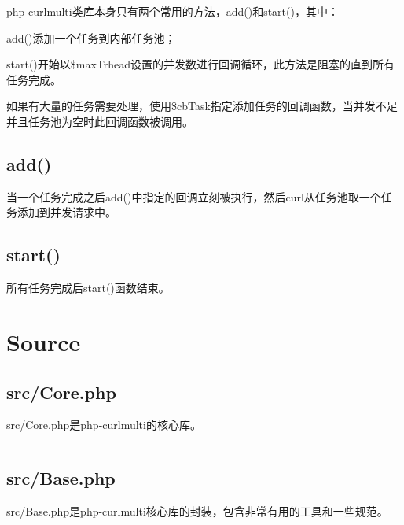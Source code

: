 php-curlmulti类库本身只有两个常用的方法，add()和start()，其中：

\begin{compactitem}
\item add()添加一个任务到内部任务池；
\item start()开始以\$maxTrhead设置的并发数进行回调循环，此方法是阻塞的直到所有任务完成。
\end{compactitem}





如果有大量的任务需要处理，使用\$cbTask指定添加任务的回调函数，当并发不足并且任务池为空时此回调函数被调用。

\subsection{add()}


当一个任务完成之后add()中指定的回调立刻被执行，然后curl从任务池取一个任务添加到并发请求中。

\subsection{start()}

所有任务完成后start()函数结束。

\section{Source}


\subsection{src/Core.php}

src/Core.php是php-curlmulti的核心库。


\begin{lstlisting}[language=PHP]

\end{lstlisting}


\subsection{src/Base.php}

src/Base.php是php-curlmulti核心库的封装，包含非常有用的工具和一些规范。





\begin{lstlisting}[language=PHP]

\end{lstlisting}


